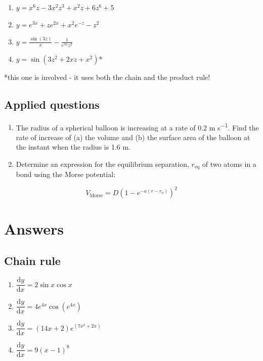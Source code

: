 \documentclass[
]{book}
\providecommand{\tightlist}{%
  \setlength{\itemsep}{0pt}\setlength{\parskip}{0pt}}
\begin{document}
\begin{enumerate}
\def\labelenumi{\arabic{enumi}.}
\tightlist
\item
  \(y = x^6z -3x^2z^3+x^2z+6z^6+5\)
\item
  \(y = e^{3x}+ze^{2x}+x^2e^{-z}-z^2\)
\item
  \(y=\frac{\sin (3z)}{x}-\frac{1}{e^{3x}z^2}\)
\item
  \(y=\sin(3z^2+2xz+x^2)\)*
\end{enumerate}

*this one is involved - it uses both the chain and the product rule!

\hypertarget{applied-questions-2}{%
\subsection{Applied questions}\label{applied-questions-2}}

\begin{enumerate}
\def\labelenumi{\arabic{enumi}.}
\item
  The radius of a spherical balloon is increasing at a rate of 0.2 m s\textsuperscript{−1}. Find the rate of increase of (a) the volume and (b) the surface area of the balloon at the instant when the radius is 1.6 m.
\item
  Determine an expression for the equilibrium separation, \(r_{\textrm{eq}}\) of two atoms in a bond using the Morse potential:
\end{enumerate}

\begin{equation*}
V_{\textrm{Morse}}= D(1-e^{-a(r-r_0)})^2
\end{equation*}

\hypertarget{sec:Answers5}{%
\section{Answers}\label{sec:Answers5}}

\hypertarget{chain-rule-1}{%
\subsection{Chain rule}\label{chain-rule-1}}

\begin{enumerate}
\def\labelenumi{\arabic{enumi}.}
\tightlist
\item
  \(\dfrac{\textrm{d}y}{\textrm{d}x}= 2 \sin x \cos x\)
\item
  \(\dfrac{\textrm{d}y}{\textrm{d}x}=4e^{4x}\cos (e^{4x})\)
\item
  \(\dfrac{\textrm{d}y}{\textrm{d}x}= (14x+2)e^{(7x^2 + 2x)}\)
\item
  \(\dfrac{\textrm{d}y}{\textrm{d}x}= 9 (x-1)^8\)
\end{enumerate}
\end{document}
